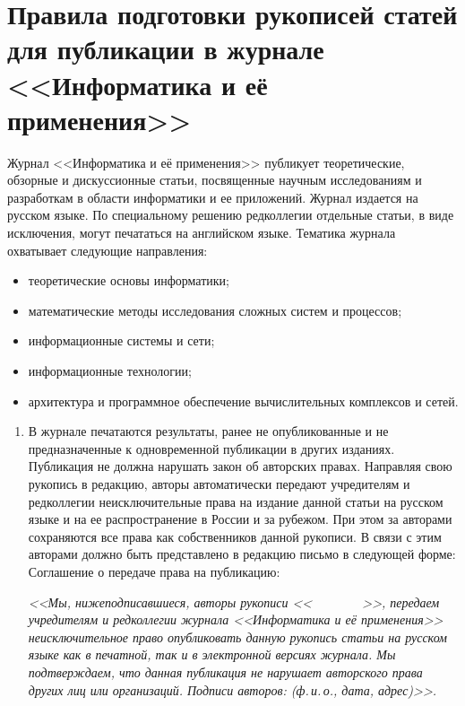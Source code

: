 \vspace*{-60pt} {%
{%
\section*{Правила подготовки рукописей статей для публикации в журнале
<<Информатика и её применения>>}

\thispagestyle{empty}

 Журнал <<Информатика и её применения>> публикует
теоретические, обзорные и дискуссионные статьи, посвященные научным
исследованиям и разработкам в области информатики и ее приложений. Журнал
издается на русском языке. По специальному решению редколлегии отдельные статьи,
в виде исключения, могут печататься на английском языке.
Тематика журнала охватывает следующие направления:
\begin{itemize}
\item теоретические основы информатики;
\item математические методы исследования сложных систем и процессов;
\item информационные системы и сети;
\item информационные технологии;
\item архитектура и программное
обеспечение вычислительных комплексов и сетей.
\end{itemize}
\begin{enumerate}
\item В журнале печатаются результаты, ранее не
опубликованные и не предназначенные к одновременной публикации в других
изданиях. Публикация не должна нарушать закон об авторских правах. Направляя
свою рукопись в редакцию, авторы автоматически передают учредителям и
редколлегии неисключительные права на издание данной статьи на русском языке и
на ее распространение в России и за рубежом. При этом за авторами сохраняются
все права как собственников данной рукописи. В связи с этим авторами должно
быть представлено в редакцию письмо в следующей форме:
Соглашение о передаче права на публикацию:

\textit{<<Мы, нижеподписавшиеся, авторы рукописи <<$\qquad\qquad$>>, передаем
учредителям и редколлегии журнала <<Информатика и её применения>>
неисключительное право опубликовать данную рукопись статьи на русском языке как
в печатной, так и в электронной версиях журнала. Мы подтверждаем, что данная
публикация не нарушает авторского права других лиц или организаций. Подписи
авторов: (ф.\,и.\,о., дата, адрес)>>.}


\end{enumerate}}}
